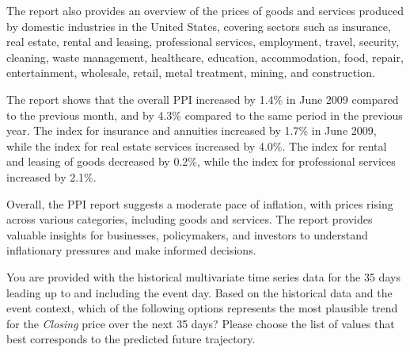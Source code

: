\begin{ReasoningBox}[title=Time Series Forecasting]
The report also provides an overview of the prices of goods and services produced by domestic industries in the United States, covering sectors such as insurance, real estate, rental and leasing, professional services, employment, travel, security, cleaning, waste management, healthcare, education, accommodation, food, repair, entertainment, wholesale, retail, metal treatment, mining, and construction.

The report shows that the overall PPI increased by 1.4\% in June 2009 compared to the previous month, and by 4.3\% compared to the same period in the previous year. The index for insurance and annuities increased by 1.7\% in June 2009, while the index for real estate services increased by 4.0\%. The index for rental and leasing of goods decreased by 0.2\%, while the index for professional services increased by 2.1\%.

Overall, the PPI report suggests a moderate pace of inflation, with prices rising across various categories, including goods and services. The report provides valuable insights for businesses, policymakers, and investors to understand inflationary pressures and make informed decisions.

You are provided with the historical multivariate time series data for the 35 days leading up to and including the event day. Based on the historical data and the event context, which of the following options represents the most plausible trend for the \textit{Closing} price over the next 35 days? Please choose the list of values that best corresponds to the predicted future trajectory.

    \vspace{0.5em}


\end{ReasoningBox}
